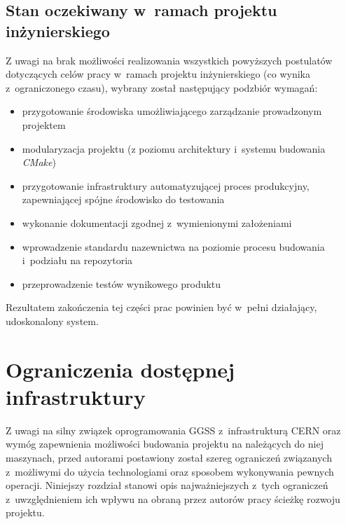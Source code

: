 \section{Stan oczekiwany w~ramach projektu inżynierskiego}
Z uwagi na brak możliwości realizowania wszystkich powyższych postulatów dotyczących celów pracy w~ramach projektu inżynierskiego (co wynika z~ograniczonego czasu), wybrany został następujący podzbiór wymagań:
\begin{itemize}
\item przygotowanie środowiska umożliwiającego zarządzanie prowadzonym projektem
\item modularyzacja projektu (z poziomu architektury i~systemu budowania \textit{CMake})
\item przygotowanie infrastruktury automatyzującej proces produkcyjny, zapewniającej spójne środowisko do testowania
\item wykonanie dokumentacji zgodnej z~wymienionymi założeniami
\item wprowadzenie standardu nazewnictwa na poziomie procesu budowania i~podziału na repozytoria
\item przeprowadzenie testów wynikowego produktu
\end{itemize}
Rezultatem zakończenia tej części prac powinien być w~pełni działający, udoskonalony system.



\chapter{Ograniczenia dostępnej infrastruktury}
\label{cha:ogra}
Z uwagi na silny związek oprogramowania GGSS z~infrastrukturą CERN oraz wymóg zapewnienia możliwości budowania projektu na należących do niej maszynach, przed autorami postawiony został szereg ograniczeń związanych z~możliwymi do użycia technologiami oraz sposobem wykonywania pewnych operacji. Niniejszy rozdział stanowi opis najważniejszych z~tych ograniczeń z~uwzględnieniem ich wpływu na obraną przez autorów pracy ścieżkę rozwoju projektu.


